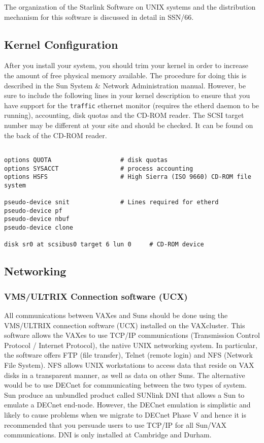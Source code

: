 The organization of the Starlink Software on UNIX systems  and the distribution
mechanism for this software is discussed  in detail in SSN/66. 

\subsection{Kernel Configuration}

After you install your system, you should trim your kernel in order to increase
the amount of free physical memory available. The procedure for doing this is
described in the Sun System \& Network Administration manual. However, be sure
to include the following lines in your kernel description to ensure that you
have support for the {\tt traffic} ethernet monitor (requires the etherd daemon
to be running), accounting, disk quotas and the CD-ROM
reader. The SCSI target number may be different at your site and should
be checked. It can be found on the back of the CD-ROM reader.

\begin{verbatim}

options QUOTA                   # disk quotas
options SYSACCT                 # process accounting
options HSFS                    # High Sierra (ISO 9660) CD-ROM file system

pseudo-device snit              # Lines required for etherd
pseudo-device pf
pseudo-device nbuf
pseudo-device clone

disk sr0 at scsibus0 target 6 lun 0     # CD-ROM device

\end{verbatim}

\subsection{Networking}

\subsubsection{VMS/ULTRIX Connection software (UCX)}

All communications between VAXes and Suns should be done using the VMS/ULTRIX
connection software (UCX) installed on the VAXcluster. This software allows the
VAXes to use TCP/IP communications (Transmission Control Protocol / Internet
Protocol), the native UNIX networking system.  In particular, the software
offers FTP (file transfer), Telnet (remote login)  and NFS (Network File
System). NFS allows UNIX workstations to access data that reside on VAX disks
in a transparent manner, as well as data on other Suns. The alternative would
be to use DECnet for communicating between the two types of system. Sun
produce an unbundled product called SUNlink DNI that allows a Sun to emulate a
DECnet end-node. However, the DECnet emulation is simplistic and likely to
cause problems when we migrate to DECnet Phase V and hence it is recommended
that you persuade users to use TCP/IP for all Sun/VAX communications. 
DNI is only installed at Cambridge and Durham. 

